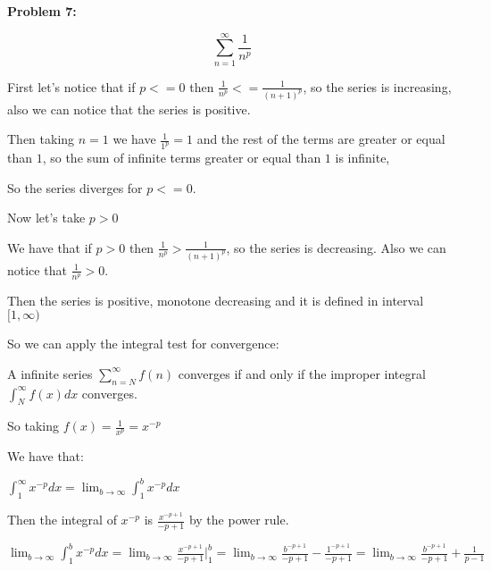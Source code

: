 \textbf{Problem 7:}

\singlespacing


\begin{equation}
    \sum_{n=1}^{\infty} \frac{1}{n^p}
\end{equation}

\singlespacing

First let's notice that if $p<=0$ then $\frac{1}{n^p} <= \frac{1}{(n+1)^p}$,
so the series is increasing, also we can notice that the series is positive.

\singlespacing

Then taking $n=1$ we have $\frac{1}{1^p} = 1$ and the rest of the terms are
greater or equal than $1$, so the sum of infinite terms greater or equal than $1$ is infinite,

\singlespacing

So the series diverges for $p<=0$.

\singlespacing
\singlespacing
\singlespacing

Now let's take $p>0$

\singlespacing

We have that if $p>0$ then $\frac{1}{n^p} > \frac{1}{(n+1)^p}$, so the series is decreasing. Also we can notice that $\frac{1}{n^p} > 0$.

\singlespacing

Then the series is positive, monotone decreasing and it is defined in interval $[1, \infty)$

\singlespacing

So we can apply the integral test for convergence:

\singlespacing

A infinite series $\sum_{n=N}^{\infty} f(n)$ converges if and only if the improper integral $\int_{N}^{\infty} f(x) dx$ converges.

\singlespacing

So taking $f(x) = \frac{1}{x^p} = x^{-p}$

\singlespacing

We have that:

\singlespacing

$\int_{1}^{\infty} x^{-p} dx = \lim_{b \to \infty} \int_{1}^{b} x^{-p} dx$

\singlespacing

Then the integral of $x^{-p}$ is $\frac{x^{-p+1}}{-p+1}$ by the power rule.

\singlespacing

$\lim_{b \to \infty} \int_{1}^{b} x^{-p} dx = \lim_{b \to \infty} \frac{x^{-p+1}}{-p+1} \Big|_{1}^{b} = \lim_{b \to \infty} \frac{b^{-p+1}}{-p+1} - \frac{1^{-p+1}}{-p+1} = \lim_{b \to \infty} \frac{b^{-p+1}}{-p+1} + \frac{1}{p-1}$

